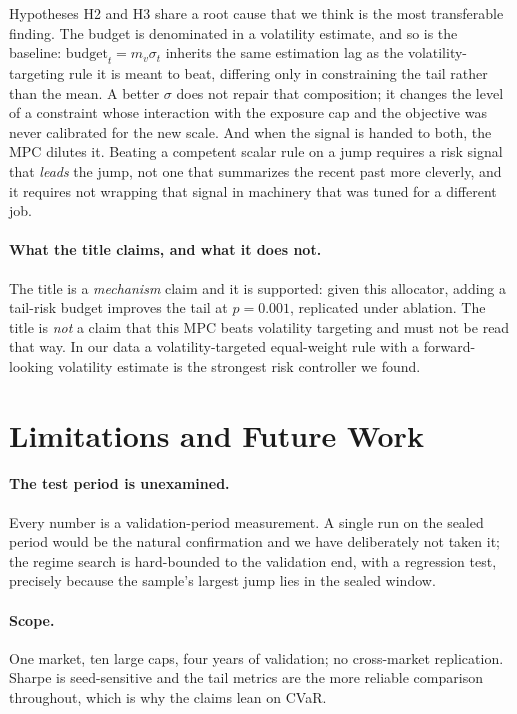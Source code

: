 \documentclass[journal]{IEEEtran}
\begin{document}
Hypotheses H2 and H3 share a root cause that we think is the most transferable
finding. The budget is denominated in a volatility estimate, and so is the
baseline: $\text{budget}_t=m_v\sigma_t$ inherits the same estimation lag as the
volatility-targeting rule it is meant to beat, differing only in constraining the
tail rather than the mean. A better $\sigma$ does not repair that composition; it
changes the level of a constraint whose interaction with the exposure cap and the
objective was never calibrated for the new scale. And when the signal is handed to
both, the MPC dilutes it. Beating a competent scalar rule on a jump requires a
risk signal that \emph{leads} the jump, not one that summarizes the recent past
more cleverly, and it requires not wrapping that signal in machinery that was
tuned for a different job.

\paragraph{What the title claims, and what it does not.} The title is a
\emph{mechanism} claim and it is supported: given this allocator, adding a
tail-risk budget improves the tail at $p=0.001$, replicated under ablation. The
title is \emph{not} a claim that this MPC beats volatility targeting and must not
be read that way. In our data a volatility-targeted equal-weight rule with a
forward-looking volatility estimate is the strongest risk controller we found.

\section{Limitations and Future Work}
\label{sec:limit}

\paragraph{The test period is unexamined.} Every number is a validation-period
measurement. A single run on the sealed period would be the natural confirmation
and we have deliberately not taken it; the regime search is hard-bounded to the
validation end, with a regression test, precisely because the sample's largest
jump lies in the sealed window.

\paragraph{Scope.} One market, ten large caps, four years of validation; no
cross-market replication. Sharpe is seed-sensitive and the tail metrics are the
more reliable comparison throughout, which is why the claims lean on CVaR.
\end{document}
